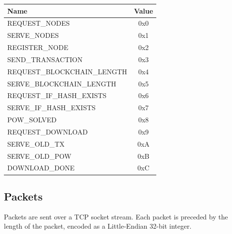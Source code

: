 \documentclass[../documentation.tex]{subfiles}
\begin{document}

\bgroup{}
\def\arraystretch{1.25}
\begin{tabular}{|l|c|}
    \hline
    \textbf{Name} & \textbf{Value}
    \\ \hline
    REQUEST\_NODES & 0x0
    \\ \hline
    SERVE\_NODES & 0x1
    \\ \hline
    REGISTER\_NODE & 0x2
    \\ \hline
    SEND\_TRANSACTION & 0x3
    \\ \hline
    REQUEST\_BLOCKCHAIN\_LENGTH & 0x4
    \\ \hline
    SERVE\_BLOCKCHAIN\_LENGTH & 0x5
    \\ \hline
    REQUEST\_IF\_HASH\_EXISTS & 0x6
    \\ \hline
    SERVE\_IF\_HASH\_EXISTS & 0x7
    \\ \hline
    POW\_SOLVED & 0x8
    \\ \hline
    REQUEST\_DOWNLOAD & 0x9
    \\ \hline
    SERVE\_OLD\_TX & 0xA
    \\ \hline
    SERVE\_OLD\_POW & 0xB
    \\ \hline
    DOWNLOAD\_DONE & 0xC
    \\ \hline

\end{tabular}
\egroup{}

\pagebreak

\hypertarget{packets}{}
\subsection{Packets}

Packets are sent over a TCP socket stream.
Each packet is preceded by the length of the packet,
encoded as a Little-Endian 32-bit integer.


\newcommand{\tline}{
    \\ \hline
}

\newcommand{\packettabular}[1]{
    \bgroup{}
    \def\arraystretch{1.25}
    \begin{center}
        \begin{tabular}{|l|l|l|}
            \hline
            \textbf{Name} & \textbf{Type} & \textbf{Descritpion}
            \tline
            ID & u8 & Packet Identifier
            \tline

            \if\relax\detokenize{#1}\relax
            \else
                #1
                \tline
            \fi
        \end{tabular}
    \end{center}
    \egroup{}
}
\end{document}
